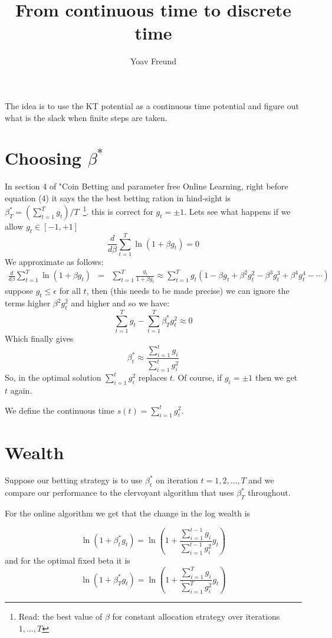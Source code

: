 \documentclass{article}
\title{From continuous time to discrete time}
\author{Yoav Freund}
\begin{document}
\maketitle

\renewcommand{\log}{\mbox{log}}

The idea is to use the KT potential as a continuous time potential and figure out what is the slack when finite steps are taken.

\section{Choosing $\beta^*$}

In section 4 of "Coin Betting and parameter free Online Learning, right before equation (4) it says the the best betting ration in
hind-sight is $\beta_T^* = \left( \sum_{t=1}^T g_t\right)/T$~\footnote{Read: the best value of $\beta$ for constant allocation strategy over iterations $1,\ldots,T$}. this is correct for $g_t = \pm 1$. Lets see what happens if we allow $g_t \in [-1,+1]$
\[
\frac{d}{d\beta} \sum_{t=1}^T \ln(1+\beta g_t) = 0
\]
We approximate as follows:
\begin{eqnarray*}
\frac{d}{d\beta} \sum_{t=1}^T \ln(1+\beta g_t) 
&=& \sum_{t=1}^T \frac{g_t}{1+\beta g_t} 
\approx \sum_{t=1}^T g_t \left( 1-\beta g_t +\beta^2 g_t^2 -\beta^3 g_t^3 + \beta^4 g_t^4-\cdots \right)
\end{eqnarray*}
suppose $g_t \leq \epsilon$ for all $t$, then (this needs to be made precise) we can ignore the terms higher $\beta^2 g_t^2$ and higher and so we have:
\[
\sum_{t=1}^T g_t - \sum_{t=1}^T \beta^*_T g_t^2 \approx 0
\]
Which finally gives
\[
\beta_t^* \approx \frac{\sum_{i=1}^t g_i}{\sum_{i=1}^t g_i^2}
\]
So, in the optimal solution $\sum_{i=1}^t g_i^2$ replaces $t$. Of course, if $g_i = \pm 1$ then we get $t$ again.

We define the continuous time $s(t) = \sum_{i=1}^t g_i^2$. 

\section{Wealth}
Suppose our betting strategy is to use $\beta_t^*$ on iteration $t=1,2,\ldots,T$ and we compare our performance to the clervoyant algorithm that uses $\beta_T^*$  throughout.

For the online algorithm we get that the change in the log wealth is 

$$
\ln (1+\beta^*_t g_t) = \ln\left(1+ \frac{\sum_{i=1}^{t-1} g_i}{\sum_{i=1}^{t-1} g_i^2} g_t\right)
$$
and for the optimal fixed beta it is
$$
\ln (1+\beta^*_T g_t) = \ln\left(1+ \frac{\sum_{i=1}^{T} g_i}{\sum_{i=1}^{T} g_i^2} g_t\right)
$$
\end{document}
